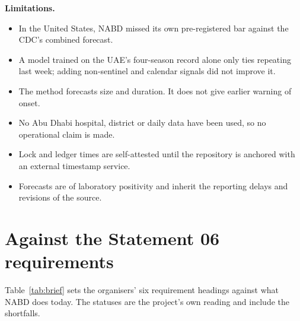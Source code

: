 \documentclass[11pt,a4paper]{article}
\begin{document}
\textbf{Limitations.}
\begin{itemize}
\item In the United States, NABD missed its own pre-registered bar against the CDC's combined forecast.
\item A model trained on the UAE's four-season record alone only ties repeating last week; adding non-sentinel and calendar signals did not improve it.
\item The method forecasts size and duration. It does not give earlier warning of onset.
\item No Abu Dhabi hospital, district or daily data have been used, so no operational claim is made.
\item Lock and ledger times are self-attested until the repository is anchored with an external timestamp service.
\item Forecasts are of laboratory positivity and inherit the reporting delays and revisions of the source.
\end{itemize}

\section{Against the Statement 06 requirements}

Table~\ref{tab:brief} sets the organisers' six requirement headings against what NABD does today. The statuses are the project's own reading and include the shortfalls.
\end{document}
